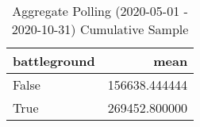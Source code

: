 \begin{table}
\centering
\caption{Aggregate Polling (2020-05-01 - 2020-10-31) Cumulative Sample}
\begin{tabular}{lr}
\toprule
 battleground &           mean \\
\midrule
        False &  156638.444444 \\
         True &  269452.800000 \\
\bottomrule
\end{tabular}
\end{table}
